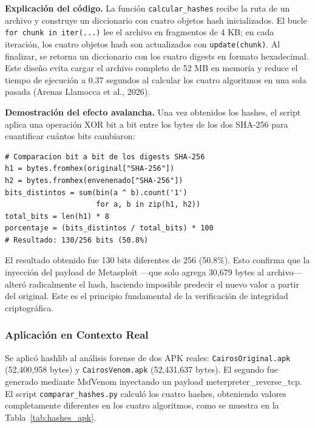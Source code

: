 \documentclass[12pt,a4paper]{article}
\begin{document}
\textbf{Explicación del código.} La función \texttt{calcular\_hashes}
recibe la ruta de un archivo y construye un diccionario con cuatro
objetos hash inicializados. El bucle \texttt{for chunk in iter(...)}
lee el archivo en fragmentos de 4 KB; en cada iteración, los cuatro
objetos hash son actualizados con \texttt{update(chunk)}. Al finalizar,
se retorna un diccionario con los cuatro digests en formato hexadecimal.
Este diseño evita cargar el archivo completo de 52 MB en memoria y
reduce el tiempo de ejecución a 0.37 segundos al calcular los cuatro
algoritmos en una sola pasada (Arenas Llamocca et al., 2026).

\textbf{Demostración del efecto avalancha.} Una vez obtenidos los
hashes, el script aplica una operación XOR bit a bit entre los bytes
de los dos SHA-256 para cuantificar cuántos bits cambiaron:

\begin{lstlisting}[caption={Cálculo del efecto avalancha con XOR sobre SHA-256},
                   label=lst:avalancha]
# Comparacion bit a bit de los digests SHA-256
h1 = bytes.fromhex(original["SHA-256"])
h2 = bytes.fromhex(envenenado["SHA-256"])
bits_distintos = sum(bin(a ^ b).count('1')
                     for a, b in zip(h1, h2))
total_bits = len(h1) * 8
porcentaje = (bits_distintos / total_bits) * 100
# Resultado: 130/256 bits (50.8%)
\end{lstlisting}

El resultado obtenido fue 130 bits diferentes de 256 (50.8\%). Esto
confirma que la inyección del payload de Metasploit —que solo agrega
30,679 bytes al archivo— alteró radicalmente el hash, haciendo imposible
predecir el nuevo valor a partir del original. Este es el principio
fundamental de la verificación de integridad criptográfica.

\subsubsection{Aplicación en Contexto Real}

Se aplicó hashlib al análisis forense de dos APK reales:
\texttt{CairosOriginal.apk} (52,400,958 bytes) y
\texttt{CairosVenom.apk} (52,431,637 bytes). El segundo fue generado
mediante MsfVenom inyectando un payload meterpreter\_reverse\_tcp. El
script \texttt{comparar\_hashes.py} calculó los cuatro hashes, obteniendo
valores completamente diferentes en los cuatro algoritmos, como se
muestra en la Tabla~\ref{tab:hashes_apk}.
\end{document}
